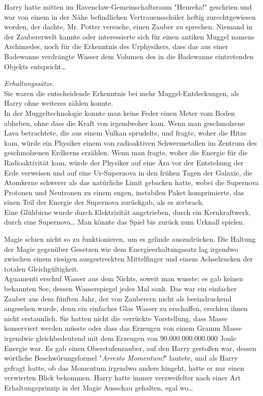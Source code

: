 {Harry hatte mitten im Ravenclaw-Gemeinschaftsraum "Heureka!" geschrien und war von einem in der Nähe befindlichen Vertrauensschüler heftig zurechtgewiesen worden, der dachte, Mr. Potter versuche, einen Zauber zu sprechen. Niemand in der Zaubererwelt kannte oder interessierte sich für einen antiken Muggel namens Archimedes, noch für die Erkenntnis des Urphysikers, dass das aus einer Badewanne verdrängte Wasser dem Volumen des in die Badewanne eintretenden Objekts entspricht…

\emph{Erhaltungssätze}.\\ Sie waren die entscheidende Erkenntnis bei mehr Muggel-Entdeckungen, als Harry ohne weiteres zählen konnte.\\ In der Muggeltechnologie konnte man keine Feder einen Meter vom Boden abheben, ohne dass die Kraft von irgendwoher kam. Wenn man geschmolzene Lava betrachtete, die aus einem Vulkan sprudelte, und fragte, woher die Hitze kam, würde ein Physiker einem von radioaktiven Schwermetallen im Zentrum des geschmolzenen Erdkerns erzählen. Wenn man fragte, woher die Energie für die Radioaktivität kam, würde der Physiker auf eine Ära vor der Entstehung der Erde verweisen und auf eine Ur-Supernova in den frühen Tagen der Galaxie, die Atomkerne schwerer als das natürliche Limit gebacken hatte, wobei die Supernova Protonen und Neutronen zu einem engen, instabilen Paket komprimierte, das einen Teil der Energie der Supernova zurückgab, als es zerbrach.\\ Eine Glühbirne wurde durch Elektrizität angetrieben, durch ein Kernkraftwerk, durch eine Supernova… Man könnte das Spiel bis zurück zum Urknall spielen.

Magie schien nicht so zu funktionieren, um es gelinde auszudrücken. Die Haltung der Magie gegenüber Gesetzen wie dem Energieerhaltungssatz lag irgendwo zwischen einem riesigen ausgestreckten Mittelfinger und einem Achselzucken der totalen Gleichgültigkeit.\\ Aguamenti erschuf Wasser aus dem Nichts, soweit man wusste; es gab keinen bekannten See, dessen Wasserspiegel jedes Mal sank. Das war ein einfacher Zauber aus dem fünften Jahr, der von Zauberern nicht als beeindruckend angesehen wurde, denn ein einfaches Glas Wasser zu erschaffen, erschien ihnen nicht erstaunlich. Sie hatten nicht die verrückte Vorstellung, dass Masse konserviert werden müsste oder dass das Erzeugen von einem Gramm Masse irgendwie gleichbedeutend mit dem Erzeugen von 90.000.000.000.000 Joule Energie war. Es gab einen Oberstufenzauber, auf den Harry gestoßen war, dessen wörtliche Beschwörungsformel "\emph{Arresto Momentum!}" lautete, und als Harry gefragt hatte, ob das Momentum irgendwo anders hingeht, hatte er nur einen verwirrten Blick bekommen. Harry hatte immer verzweifelter nach einer Art Erhaltungsprinzip in der Magie Ausschau gehalten, egal wo…

}
